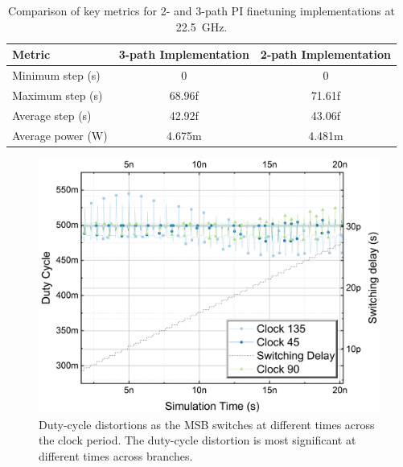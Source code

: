 


\begin{table}[h]
\centering
\caption{Comparison of key metrics for 2- and 3-path PI finetuning implementations at 22.5~GHz.}
\begin{tabular}{|l|c|c|}
\hline
\textbf{Metric} & \textbf{3-path Implementation} & \textbf{2-path Implementation} \\
\hline
Minimum step (s) & 0 & 0 \\
Maximum step (s) & 68.96f & 71.61f \\
Average step (s) & 42.92f & 43.06f \\
Average power (W) & 4.675m & 4.481m \\
\hline
\end{tabular}
\label{tab:phase_interpolator_metrics}
\end{table}


\begin{figure}[H]
  \centering
  \includegraphics[width=0.8\linewidth]{figures/Results/Final_HF_LF_MF-DCD_vs_switchingDelay.png}
  \caption{Duty-cycle distortions as the MSB switches at different times across the clock period. The duty-cycle distortion is most significant at different times across branches.}
  \label{fig:dcd_MSB}
\end{figure}

